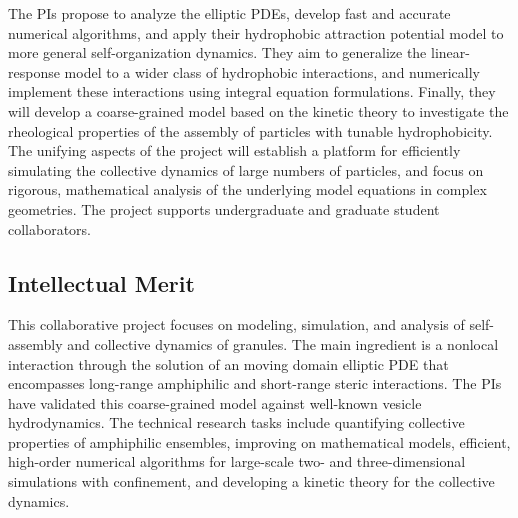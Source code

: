 \documentclass[10pt]{article}
\begin{document}
The PIs propose to analyze the elliptic PDEs, develop fast and accurate
numerical algorithms, and apply their hydrophobic attraction potential
model to more general self-organization dynamics. They aim to generalize
the linear-response model to a wider class of hydrophobic interactions,
and numerically implement these interactions using integral equation
formulations. Finally, they will develop a coarse-grained model based on
the kinetic theory to investigate the rheological properties of the
assembly of particles with tunable hydrophobicity. The unifying aspects
of the project will establish a platform for efficiently simulating
the collective dynamics of large numbers of particles, and focus on
rigorous, mathematical analysis of the underlying model equations in
complex geometries. The project supports undergraduate and graduate
student collaborators.

\subsection*{Intellectual Merit}
\vspace{-0.1in}
This collaborative project focuses on modeling, simulation, and analysis
of self-assembly and collective dynamics of granules. The main
ingredient is a nonlocal interaction through the solution of an moving
domain elliptic PDE that encompasses long-range amphiphilic and
short-range steric interactions. The PIs have validated this
coarse-grained model against well-known vesicle hydrodynamics. The
technical research tasks include quantifying collective properties of
amphiphilic ensembles, improving on mathematical models, efficient,
high-order numerical algorithms for large-scale two- and
three-dimensional simulations with confinement, and developing a kinetic
theory for the collective dynamics.

\end{document}

